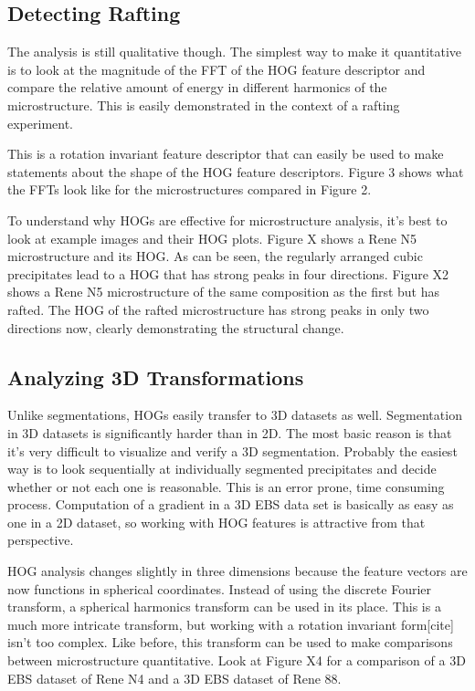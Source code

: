 \documentclass[review]{elsarticle}
\begin{document}
	\subsection{Detecting Rafting}
	The analysis is still qualitative though. The simplest way to make it quantitative is to look at the magnitude of the FFT of the HOG feature descriptor and compare the relative amount of energy in different harmonics of the microstructure. This is easily demonstrated in the context of a rafting experiment. 
	
	This is a rotation invariant feature descriptor that can easily be used to make statements about the shape of the HOG feature descriptors. Figure 3 shows what the FFTs look like for the microstructures compared in Figure 2.
	
	To understand why HOGs are effective for microstructure analysis, it's best to look at example images and their HOG plots. Figure X shows a Rene N5 microstructure and its HOG. As can be seen, the regularly arranged cubic precipitates lead to a HOG that has strong peaks in four directions. Figure X2 shows a Rene N5 microstructure of the same composition as the first but has rafted. The HOG of the rafted microstructure has strong peaks in only two directions now, clearly demonstrating the structural change.


	\subsection{Analyzing 3D Transformations}

	Unlike segmentations, HOGs easily transfer to 3D datasets as well. Segmentation in 3D datasets is significantly harder than in 2D. The most basic reason is that it's very difficult to visualize and verify a 3D segmentation. Probably the easiest way is to look sequentially at individually segmented precipitates and decide whether or not each one is reasonable. This is an error prone, time consuming process. Computation of a gradient in a 3D EBS data set is basically as easy as one in a 2D dataset, so working with HOG features is attractive from that perspective.

	HOG analysis changes slightly in three dimensions because the feature vectors are now functions in spherical coordinates. Instead of using the discrete Fourier transform, a spherical harmonics transform can be used in its place. This is a much more intricate transform, but working with a rotation invariant form[cite] isn't too complex. Like before, this transform can be used to make comparisons between microstructure quantitative. Look at Figure X4 for a comparison of a 3D EBS dataset of Rene N4 and a 3D EBS dataset of Rene 88.
\end{document}
